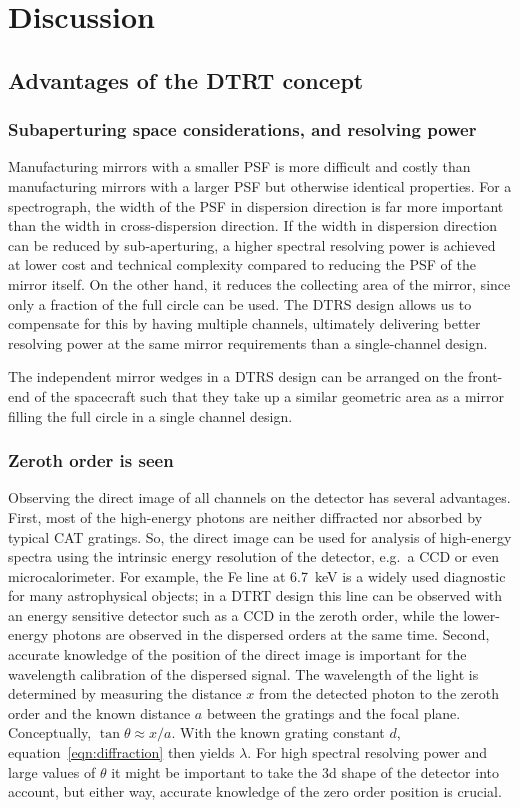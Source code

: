\documentclass[linenumbers]{aastex631}
\begin{document}
\section{Discussion}
\label{sect:discussion}

\subsection{Advantages of the DTRT concept}
\subsubsection{Subaperturing space considerations, and resolving power}
Manufacturing mirrors with a smaller PSF is more difficult and costly than manufacturing mirrors with a larger PSF but otherwise identical properties. For a spectrograph, the width of the PSF in dispersion direction is far more important than the width in cross-dispersion direction. If the width in dispersion direction can be reduced by sub-aperturing, a higher spectral resolving power is achieved at lower cost and technical complexity compared to reducing the PSF of the mirror itself. On the other hand, it reduces the collecting area of the mirror, since only a fraction of the full circle can be used. The DTRS design allows us to compensate for this by having multiple channels, ultimately delivering better resolving power at the same mirror requirements than a single-channel design.

The independent mirror wedges in a DTRS design can be arranged on the front-end of the spacecraft such that they take up a similar geometric area as a mirror filling the full circle in a single channel design.

\subsubsection{Zeroth order is seen}
Observing the direct image of all channels on the detector has several advantages. First, most of the high-energy photons are neither diffracted nor absorbed by typical CAT gratings. So, the direct image can be used for analysis of high-energy spectra using the intrinsic energy resolution of the detector, e.g.\ a CCD or even microcalorimeter. For example, the Fe line at 6.7~keV is a widely used diagnostic for many astrophysical objects; in a DTRT design this line can be observed with an energy sensitive detector such as a CCD in the zeroth order, while the lower-energy photons are observed in the dispersed orders at the same time. Second, accurate knowledge of the position of the direct image is important for the wavelength calibration of the dispersed signal. The wavelength of the light is determined by measuring the distance $x$ from the detected photon to the zeroth order and the known distance $a$ between the gratings and the focal plane. Conceptually, $\tan \theta \approx x/a$. With the known grating constant $d$, equation~\ref{eqn:diffraction} then yields $\lambda$. For high spectral resolving power and large values of $\theta$ it might be important to take the 3d shape of the detector into account, but either way, accurate knowledge of the zero order position is crucial.
\end{document}
